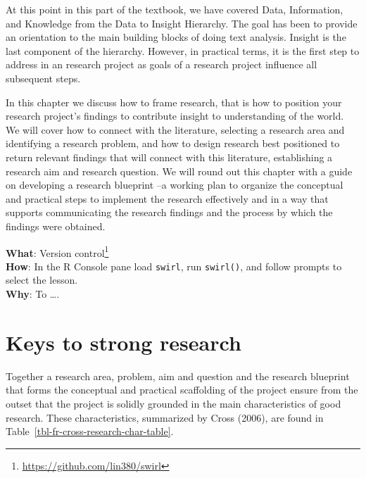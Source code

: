 \documentclass[
  letterpaper,
]{latex/krantz}
\DeclareRobustCommand{\href}[2]{#2\footnote{\url{#1}}}
\begin{document}
At this point in this part of the textbook, we have covered Data,
Information, and Knowledge from the Data to Insight Hierarchy. The goal
has been to provide an orientation to the main building blocks of doing
text analysis. Insight is the last component of the hierarchy. However,
in practical terms, it is the first step to address in an research
project as goals of a research project influence all subsequent steps.

In this chapter we discuss how to frame research, that is how to
position your research project's findings to contribute insight to
understanding of the world. We will cover how to connect with the
literature, selecting a research area and identifying a research
problem, and how to design research best positioned to return relevant
findings that will connect with this literature, establishing a research
aim and research question. We will round out this chapter with a guide
on developing a research blueprint --a working plan to organize the
conceptual and practical steps to implement the research effectively and
in a way that supports communicating the research findings and the
process by which the findings were obtained.

\begin{tcolorbox}[enhanced jigsaw, colbacktitle=quarto-callout-tip-color!10!white, arc=.35mm, toprule=.15mm, breakable, colframe=quarto-callout-tip-color-frame, bottomrule=.15mm, opacitybacktitle=0.6, coltitle=black, titlerule=0mm, colback=white, toptitle=1mm, bottomtitle=1mm, title=\textcolor{quarto-callout-tip-color}{\faLightbulb}\hspace{0.5em}{Interactive programming}, rightrule=.15mm, leftrule=.75mm, opacityback=0, left=2mm]

\textbf{What}: \href{https://github.com/lin380/swirl}{Version control}\\
\textbf{How}: In the R Console pane load \texttt{swirl}, run
\texttt{swirl()}, and follow prompts to select the lesson.\\
\textbf{Why}: To \ldots.

\end{tcolorbox}

\hypertarget{fr-keys}{%
\section{Keys to strong research}\label{fr-keys}}

Together a research area, problem, aim and question and the research
blueprint that forms the conceptual and practical scaffolding of the
project ensure from the outset that the project is solidly grounded in
the main characteristics of good research. These characteristics,
summarized by Cross (2006), are found in
Table~\ref{tbl-fr-cross-research-char-table}.
\end{document}
